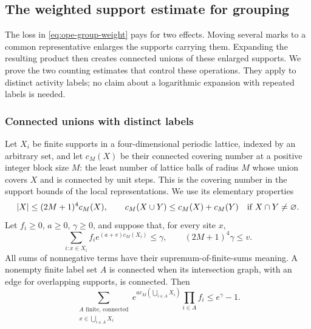 \subsection{The weighted support estimate for grouping}
\label{sec:ope-grouping}
The loss in \eqref{eq:ope-group-weight} pays for two effects. Moving
several marks to a common representative enlarges the supports carrying
them. Expanding the resulting product then creates connected unions
of these enlarged supports. We prove the two counting estimates that
control these operations. They apply to distinct activity labels; no
claim about a logarithmic expansion with repeated labels is needed.

\subsubsection{Connected unions with distinct labels}
Let $X_i$ be finite supports in a four-dimensional periodic lattice,
indexed by an arbitrary set, and let $c_M(X)$ be their connected
covering number at a positive integer block size $M$: the least number
of lattice balls of radius $M$ whose union covers $X$ and is connected
by unit steps. This is the covering number in the support bounds of the
local representations. We use its elementary properties
\[
 |X|\leq(2M+1)^4c_M(X),\qquad
 c_M(X\cup Y)\leq c_M(X)+c_M(Y)\quad\hbox{if }X\cap Y\ne\varnothing.
\]
Let $f_i\geq0$, $a\geq0$, $\gamma\geq0$, and suppose that, for every
site $x$,
\begin{equation}\label{eq:ope-hit-hypothesis}
 \sum_{i:x\in X_i} f_i e^{(a+v)c_M(X_i)}\leq\gamma,
 \qquad (2M+1)^4\gamma\leq v.
\end{equation}
All sums of nonnegative terms have their supremum-of-finite-sums
meaning. A nonempty finite label set $A$ is connected when its
intersection graph, with an edge for overlapping supports, is connected.
Then
\begin{equation}\label{eq:ope-forest-price}
 \sum_{\substack{A\text{ finite, connected}\\x\in\bigcup_{i\in A}X_i}}
 e^{a c_M(\bigcup_{i\in A}X_i)}\prod_{i\in A}f_i
 \leq e^\gamma-1.
\end{equation}

